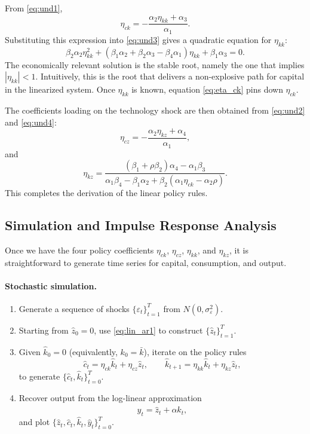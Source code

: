 \documentclass[12pt]{article}
\begin{document}
From \eqref{eq:und1},
\begin{equation}
\eta_{ck} = -\frac{\alpha_2\eta_{kk}+\alpha_3}{\alpha_1}.
\label{eq:eta_ck}
\end{equation}
Substituting this expression into \eqref{eq:und3} gives a quadratic equation for $\eta_{kk}$:
\begin{equation}
\beta_2\alpha_2\eta_{kk}^2
+ \left(\beta_1\alpha_2+\beta_2\alpha_3-\beta_4\alpha_1\right)\eta_{kk}
+ \beta_1\alpha_3
= 0.
\label{eq:eta_kk}
\end{equation}
The economically relevant solution is the stable root, namely the one that implies $|\eta_{kk}|<1$. Intuitively, this is the root that delivers a non-explosive path for capital in the linearized system. Once $\eta_{kk}$ is known, equation \eqref{eq:eta_ck} pins down $\eta_{ck}$.

The coefficients loading on the technology shock are then obtained from \eqref{eq:und2} and \eqref{eq:und4}:
\begin{equation*}
\eta_{cz} = -\frac{\alpha_2\eta_{kz}+\alpha_4}{\alpha_1},
\end{equation*}
and
\begin{equation*}
\eta_{kz}
=
\frac{\left(\beta_1+\rho\beta_2\right)\alpha_4-\alpha_1\beta_3}
{\alpha_1\beta_4-\beta_1\alpha_2+\beta_2\left(\alpha_1\eta_{ck}-\alpha_2\rho\right)}.
\end{equation*}
This completes the derivation of the linear policy rules.

\subsection{Simulation and Impulse Response Analysis}

Once we have the four policy coefficients $\eta_{ck}$, $\eta_{cz}$, $\eta_{kk}$, and $\eta_{kz}$, it is straightforward to generate time series for capital, consumption, and output.

\paragraph{Stochastic simulation.}
\begin{enumerate}
\item Generate a sequence of shocks $\{\varepsilon_t\}_{t=1}^T$ from $N(0,\sigma_\varepsilon^2)$.
\item Starting from $\hat z_0=0$, use \eqref{eq:lin_ar1} to construct $\{\hat z_t\}_{t=1}^T$.
\item Given $\hat k_0=0$ (equivalently, $k_0=\bar k$), iterate on the policy rules
\begin{equation*}
\hat c_t = \eta_{ck}\hat k_t + \eta_{cz}\hat z_t,
\qquad
\hat k_{t+1} = \eta_{kk}\hat k_t + \eta_{kz}\hat z_t,
\end{equation*}
to generate $\{\hat c_t,\hat k_t\}_{t=0}^T$.
\item Recover output from the log-linear approximation
\begin{equation*}
\hat y_t = \hat z_t + \alpha \hat k_t,
\end{equation*}
and plot $\{\hat z_t,\hat c_t,\hat k_t,\hat y_t\}_{t=0}^T$.
\end{enumerate}
\end{document}
